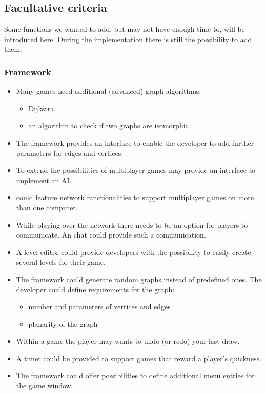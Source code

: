 \subsection{Facultative criteria}\label{REF:FACULTATIVE-CRITERIA}
Some functions we wanted to add, but may not have enough time to, will be introduced here. During the implementation there is still the possibility to add them.

\subsubsection{Framework}
\begin{itemize}

	\item Many \glspl{game} need additional (advanced) \gls{graph} \glspl{algorithm}:
	\begin{itemize}
		\item Dijkstra
		\item an algorithm to check if two graphs are isomorphic
		.
	\end{itemize}

	\item The framework provides an interface to enable the developer to add further parameters for edges and vertices.
	\item To extend the possibilities of multiplayer games {\graphioli} may provide an interface to implement an \gls{AI}.

	\item {\graphioli} could feature network functionalities to support multiplayer games on more than one computer.

	\item While playing over the network there needs to be an option for players to communicate. An \gls{chat} could provide such a communication.

	\item A \gls{level-editor} could provide \glspl{developer} with the possibility to easily create several levels for their game.

	\item The framework could generate random graphs instead of predefined ones. The developer could define requirements for the graph:
	\begin{itemize}
		\item number and parameters of vertices and edges
		\item planarity of the graph
	\end{itemize}

	\item Within a game the player may wants to \gls{undo} (or \gls{redo}) your last draw.

	\item A timer could be provided to support games that reward a player's quickness.

	\item The framework could offer possibilities to define additional menu entries for the game window.

\end{itemize}

